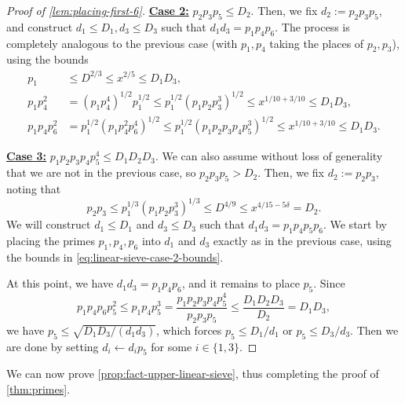 \documentclass[reqno,11pt]{amsart}
\theoremstyle{remark}
\numberwithin{equation}{section}
\begin{document}
\begin{proof}[Proof of \cref{lem:placing-first-6}]
\underline{\textbf{Case 2:}} $p_2 p_3 p_5 \le D_2$. Then, we fix $d_2 := p_2 p_3 p_5$, and construct $d_1 \le D_1, d_3 \le D_3$ such that $d_1 d_3 = p_1 p_4 p_6$. The process is completely analogous to the previous case (with $p_1, p_4$ taking the places of $p_2, p_3$), using the bounds
\begin{equation} \label{eq:linear-sieve-case-2-bounds}
\begin{aligned}
    p_1 &\le D^{2/3} \le x^{2/5} \le D_1 D_3,
    \\
    p_1 p_4^2 &= \left(p_1 p_4^4\right)^{1/2} p_1^{1/2} 
    \le 
    p_1^{1/2} \left(p_1 p_2 p_3^3\right)^{1/2} 
    \le x^{1/10 + 3/10} \le D_1 D_3,
    \\
    p_1 p_4 p_6^2 &= p_1^{1/2} \left(p_1 p_4^2 p_6^4\right)^{1/2}
    \le
    p_1^{1/2} \left(p_1 p_2 p_3 p_4 p_5^3\right)^{1/2}
    \le 
    x^{1/10 + 3/10} \le D_1 D_3.
\end{aligned}
\end{equation}

\underline{\textbf{Case 3:}} $p_1 p_2 p_3 p_4 p_5^4 \le D_1 D_2 D_3$. We can also assume without loss of generality that we are not in the previous case, so $p_2 p_3 p_5 > D_2$. Then, we fix $d_2 := p_2 p_3$, noting that
\[
    p_2 p_3 \le p_1^{1/3} (p_1 p_2 p_3^3)^{1/3} \le D^{4/9} \le x^{4/15 - 5\delta} = D_2.
\]
We will construct $d_1 \le D_1$ and $d_3 \le D_3$ such that $d_1 d_3 = p_1 p_4 p_5 p_6$. 
We start by placing the primes $p_1, p_4, p_6$ into $d_1$ and $d_3$ exactly as in the previous case, using the bounds in \cref{eq:linear-sieve-case-2-bounds}.

At this point, we have $d_1 d_3 = p_1 p_4 p_6$, and it remains to place $p_5$. Since
\[
    p_1 p_4 p_6 p_5^2 \le p_1 p_4 p_5^3 = \frac{p_1 p_2 p_3 p_4 p_5^4}{p_2 p_3 p_5} \le \frac{D_1 D_2 D_3}{D_2} = D_1 D_3,
\]
we have $p_5 \le \sqrt{D_1 D_3 / (d_1 d_3)}$, which forces $p_5 \le D_1/d_1$ or $p_5 \le D_3/d_3$. Then we are done by setting $d_i \gets d_i p_5$ for some $i \in \{1, 3\}$.
\end{proof}


We can now prove \cref{prop:fact-upper-linear-sieve}, thus completing the proof of \cref{thm:primes}.
\end{document}
